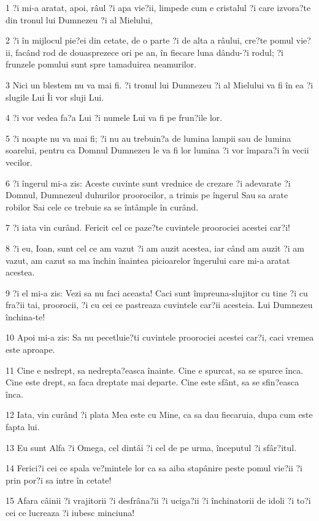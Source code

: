 \par 1 ?i mi-a aratat, apoi, râul ?i apa vie?ii, limpede cum e cristalul ?i care izvora?te din tronul lui Dumnezeu ?i al Mielului,
\par 2 ?i în mijlocul pie?ei din cetate, de o parte ?i de alta a râului, cre?te pomul vie?ii, facând rod de douasprezece ori pe an, în fiecare luna dându-?i rodul; ?i frunzele pomului sunt spre tamaduirea neamurilor.
\par 3 Nici un blestem nu va mai fi. ?i tronul lui Dumnezeu ?i al Mielului va fi în ea ?i slugile Lui Îi vor sluji Lui.
\par 4 ?i vor vedea fa?a Lui ?i numele Lui va fi pe frun?ile lor.
\par 5 ?i noapte nu va mai fi; ?i nu au trebuin?a de lumina lampii sau de lumina soarelui, pentru ca Domnul Dumnezeu le va fi lor lumina ?i vor împara?i în vecii vecilor.
\par 6 ?i îngerul mi-a zis: Aceste cuvinte sunt vrednice de crezare ?i adevarate ?i Domnul, Dumnezeul duhurilor proorocilor, a trimis pe îngerul Sau sa arate robilor Sai cele ce trebuie sa se întâmple în curând.
\par 7 ?i iata vin curând. Fericit cel ce paze?te cuvintele proorociei acestei car?i!
\par 8 ?i eu, Ioan, sunt cel ce am vazut ?i am auzit acestea, iar când am auzit ?i am vazut, am cazut sa ma închin înaintea picioarelor îngerului care mi-a aratat acestea.
\par 9 ?i el mi-a zis: Vezi sa nu faci aceasta! Caci sunt împreuna-slujitor cu tine ?i cu fra?ii tai, proorocii, ?i cu cei ce pastreaza cuvintele car?ii acesteia. Lui Dumnezeu închina-te!
\par 10 Apoi mi-a zis: Sa nu pecetluie?ti cuvintele proorociei acestei car?i, caci vremea este aproape.
\par 11 Cine e nedrept, sa nedrepta?easca înainte. Cine e spurcat, sa se spurce înca. Cine este drept, sa faca dreptate mai departe. Cine este sfânt, sa se sfin?easca înca.
\par 12 Iata, vin curând ?i plata Mea este cu Mine, ca sa dau fiecaruia, dupa cum este fapta lui.
\par 13 Eu sunt Alfa ?i Omega, cel dintâi ?i cel de pe urma, începutul ?i sfâr?itul.
\par 14 Ferici?i cei ce spala ve?mintele lor ca sa aiba stapânire peste pomul vie?ii ?i prin por?i sa intre în cetate!
\par 15 Afara câinii ?i vrajitorii ?i desfrâna?ii ?i uciga?ii ?i închinatorii de idoli ?i to?i cei ce lucreaza ?i iubesc minciuna!

